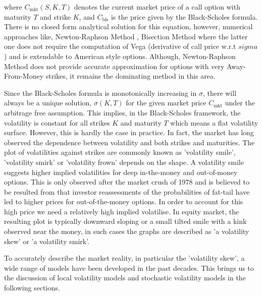  where $C_\text{mkt}(S,K,T)$ denotes the current market price of a call option with maturity $T$ and strike $K$, and $C_\text{bls}$ is the price given by the Black-Scholes formula. There is no closed form analytical solution for this equation, however, numerical approaches like, Newton-Raphson Method , Bisection Method where the latter one does not require the computation of Vega (derivative of call price w.r.t $sigma$) and is extendable to American style options.  Although, Newton-Raphson Method does not provide accurate approximation for options with very Away-From-Money strikes, it remains the dominating method in this area. 
 
Since the Black-Scholes formula is monotonically increasing in $\sigma$, there will always be a unique solution, $\sigma(K,T)$ for the given market price $C_\text{mkt}$ under the arbitrage free assumption. This implies, in the Black-Scholes framework, the volatility is constant for all strikes $K$ and maturity $T$ which means a flat volatility surface. However, this is hardly the case in practice. In fact, the market has long observed the dependence between volatility and both strikes and maturities. 
 The plot of volatilities against strikes are commonly known as 'volatility smile', 'volatility smirk' or 'volatility frown' depends on the shape. A volatility smile suggests higher implied volatilities for deep in-the-money and out-of-money options. This is only observed after the market crush of 1978\parencite{hull2006} and  is believed to be resulted from that investor reassessments of the probabilities of fat-tail have led to higher prices for out-of-the-money options. In order to account for this high price we need a relatively high implied volatilise. In equity market, the resulting plot is typically downward sloping or a small tilted smile with a kink observed near the money, in such cases the graphs are described as 'a volatility skew' or 'a volatility smirk'.

To accurately describe the market reality, in particular the 'volatility skew', a wide range of models have been developed in the past decades. This brings us to the discussion of local volatility models and stochastic volatility models in the following sections.

 
